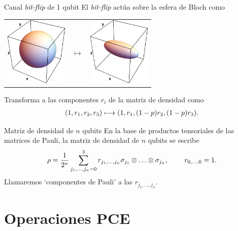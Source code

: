 \documentclass[xcolor=dvipsnames,presentation]{beamer}%
\begin{document}
\begin{frame}{Canal \textit{bit-flip} de 1 qubit}
	El \textit{bit-flip} actúa sobre la esfera de Bloch como
	\begin{center}
	\begin{tabular}{m{2.5cm} m{1.5cm} m{2.5cm}}
		\includegraphics[width=3cm]{unit_sph}
		& \hfill \LARGE{$\longmapsto$} \hfill
		& \includegraphics[width=3cm]{bit_flip_p0_3}
	\end{tabular}
	\end{center}
	
	Transforma a las componentes $r_i$ de la matriz de densidad como
	\begin{align*}
	\qty(1,r_1,r_2,r_3) \longmapsto \qty(1,r_1,\qty(1-p)r_2,\qty(1-p)r_3).
	\end{align*}
\end{frame}

\begin{frame}{Matriz de densidad de $n$ qubits}
	En la base de productos tensoriales de las matrices de Pauli, 
	la matriz de densidad de $n$ qubits se escribe
	\begin{align*}
		\rho = \frac{1}{2^n}\sum _{j_1,\ldots,j_n=0}^3 r_{j_1,\ldots,j_n}
		\sigma_{j_1}\otimes \ldots
		\otimes\sigma_{j_n},\hspace{.8cm} r_{0,\ldots,0}=1.
	\end{align*}
	\alert{Llamaremos `componentes de Pauli' a las $r_{j_1,\ldots,j_n}$.}
\end{frame}

\section{Operaciones PCE}
\label{sec:Theory}
\end{document}
